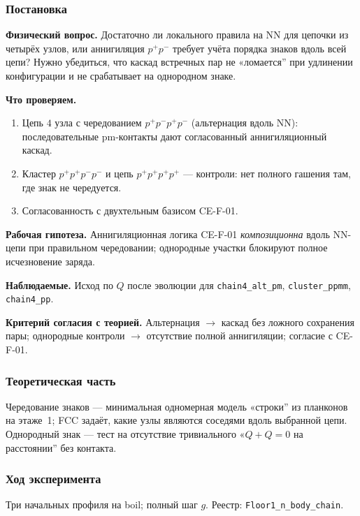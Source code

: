 \label{exp:cef02}

\subsubsection*{Постановка}
\textbf{Физический вопрос.}
Достаточно ли локального правила на NN для цепочки из четырёх узлов, или аннигиляция $p^+p^-$ требует учёта порядка знаков вдоль всей цепи?
Нужно убедиться, что каскад встречных пар не «ломается'' при удлинении конфигурации и не срабатывает на однородном знаке.

\textbf{Что проверяем.}
\begin{enumerate}[label=\textbf{(\alph*)},leftmargin=*,itemsep=0.25em]
\item Цепь $4$ узла с чередованием $p^+p^-p^+p^-$ (альтернация вдоль NN): последовательные pm-контакты дают согласованный аннигиляционный каскад.
\item Кластер $p^+p^+p^-p^-$ и цепь $p^+p^+p^+p^+$ --- контроли: нет полного гашения там, где знак не чередуется.
\item Согласованность с двухтельным базисом CE-F-01.
\end{enumerate}

\textbf{Рабочая гипотеза.}
Аннигиляционная логика CE-F-01 \emph{композиционна} вдоль NN-цепи при правильном чередовании; однородные участки блокируют полное исчезновение заряда.

\textbf{Наблюдаемые.}
Исход по $Q$ после эволюции для \texttt{chain4\_alt\_pm}, \texttt{cluster\_ppmm}, \texttt{chain4\_pp}.

\textbf{Критерий согласия с теорией.}
Альтернация $\to$ каскад без ложного сохранения пары; однородные контроли $\to$ отсутствие полной аннигиляции; согласие с CE-F-01.

\subsubsection*{Теоретическая часть}
Чередование знаков --- минимальная одномерная модель «строки'' из планконов на этаже~1; FCC задаёт, какие узлы являются соседями вдоль выбранной цепи.
Однородный знак --- тест на отсутствие тривиального «$Q+Q=0$ на расстоянии'' без контакта.

\subsubsection*{Ход эксперимента}
Три начальных профиля на boil; полный шаг $g$.
Реестр: \texttt{Floor1\_n\_body\_chain}.

